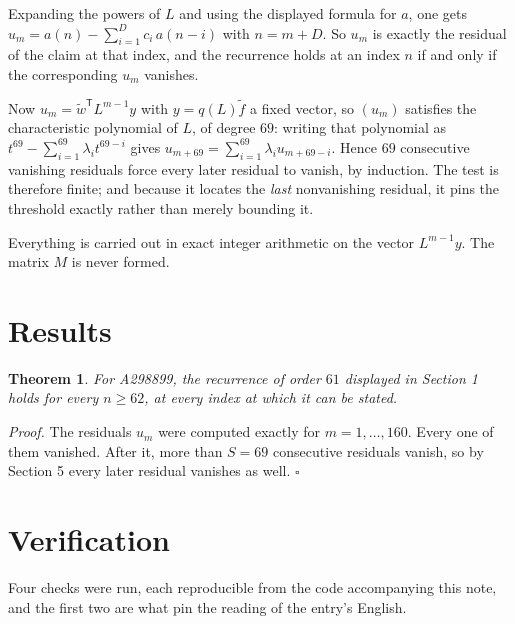 \documentclass[11pt]{article}
\newtheorem{theorem}{Theorem}
\theoremstyle{definition}
\begin{document}
Expanding the powers of $L$ and using the displayed formula for $a$, one gets $u_m = a(n) - \sum_{i=1}^{D} c_i\,a(n-i)$ with $n = m + D$. So $u_m$ is exactly the residual of the claim at that index, and the recurrence holds at an index $n$ if and only if the corresponding $u_m$ vanishes.

Now $u_m = \tilde w^{\mathsf T} L^{m-1} y$ with $y = q(L)\tilde f$ a fixed vector, so $(u_m)$ satisfies the characteristic polynomial of $L$, of degree $69$: writing that polynomial as $t^{69} - \sum_{i=1}^{69} \lambda_i t^{69-i}$ gives $u_{m+69} = \sum_{i=1}^{69} \lambda_i u_{m+69-i}$. Hence $69$ consecutive vanishing residuals force every later residual to vanish, by induction. The test is therefore finite; and because it locates the {\itshape last} nonvanishing residual, it pins the threshold exactly rather than merely bounding it.

Everything is carried out in exact integer arithmetic on the vector $L^{m-1}y$. The matrix $M$ is never formed.

\section{Results}

\begin{theorem} For A298899, the recurrence of order $61$ displayed in Section 1 holds for every $n \ge 62$, at every index at which it can be stated.\end{theorem}

{\itshape Proof.} The residuals $u_m$ were computed exactly for $m = 1,\dots,160$. Every one of them vanished. After it, more than $S = 69$ consecutive residuals vanish, so by Section 5 every later residual vanishes as well. $\square$

\section{Verification}

Four checks were run, each reproducible from the code accompanying this note, and the first two are what pin the reading of the entry's English.
\end{document}
